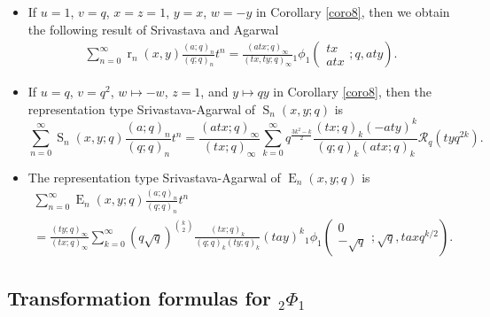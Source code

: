 \documentclass{cimart}
\DeclareMathOperator{\opE}{E}
\DeclareMathOperator{\opr}{r}
\DeclareMathOperator{\opS}{S}
\begin{document}
\begin{itemize}
    \item
    If $u=1$, $v=q$, $x=z=1$, $y=x$, $w=-y$ in Corollary \ref{coro8}, then we obtain the following result of Srivastava and Agarwal \cite{Sri}
\begin{align*}
    \sum_{n=0}^{\infty}\opr_{n}(x,y)\frac{(a;q)_{n}}{(q;q)_{n}}t^n=\frac{(atx;q)_{\infty}}{(tx,ty;q)_{\infty}}{}_{1}\phi_{1}\left(
        \begin{array}{c}
             tx \\
             atx
        \end{array};
        q,aty
        \right).
\end{align*}
\item 
If $u=q$, $v=q^2$, $w\mapsto-w$, $z=1$, and $y\mapsto qy$ in Corollary \ref{coro8}, then the representation type Srivastava-Agarwal of $\opS_{n}(x,y;q)$ is
\begin{equation}
    \sum_{n=0}^{\infty}\opS_{n}(x,y;q)\frac{(a;q)_{n}}{(q;q)_{n}}t^n=\frac{(atx;q)_{\infty}}{(tx;q)_{\infty}}\sum_{k=0}^{\infty}q^{\frac{3k^2-k}{2}}\frac{(tx;q)_{k}(-aty)^k}{(q;q)_{k}(atx;q)_{k}}\mathcal{R}_{q}(tyq^{2k}).
\end{equation}
\item 
The representation type Srivastava-Agarwal of $\opE_{n}(x,y;q)$ is
\begin{multline}
    \sum_{n=0}^{\infty}\opE_{n}(x,y;q)\frac{(a;q)_{n}}{(q;q)_{n}}t^n\\
    =\frac{(ty;q)_{\infty}}{(tx;q)_{\infty}}\sum_{k=0}^{\infty}(q\sqrt{q})^{\binom{k}{2}}\frac{(tx;q)_{k}}{(q;q)_{k}(ty;q)_{k}}(tay)^k{}_{1}\phi_{1}\left(
        \begin{array}{c}
            0\\
             -\sqrt{q}
        \end{array};
        \sqrt{q},taxq^{k/2}
        \right).
\end{multline}
\end{itemize}



\subsection{Transformation formulas for \texorpdfstring{${}_{2}\Phi_{1}$}{2Phi1}}
\end{document}
